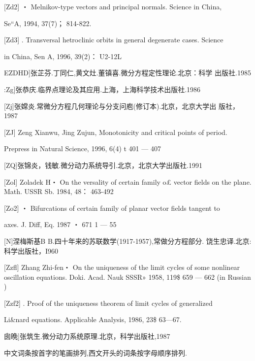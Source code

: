 \documentclass{article}
\begin{document}
{[}Zd2{]} ・ Melnikov-type vectors and principal normals. Science in
China,

Se``A, 1994, 37(7)； 814-822.

{[}Zd3{]} . Transversal hetroclinic orbits in general degenerate cases.
Science

in China, Sen A, 1996, 39(2)： U2-12L

EZDHD{]}张芷芬.丁同仁,黄文灶.董镇喜.微分方程定性理论.北京：科学
出版社.1985

:Zg{]}张恭庆.临界点理论及其应用.上海，上海科学技术出版社.1986

{[}Zj{]}张嫦炎.常微分方程几何理论与分支问庖(修订本).北京，北京大学出
版社，1987

{[}ZJ{]} Zeng Xianwu, Jing Zujun, Monotonicity and critical points of
period.

Prepress in Natural Science, 1996, 6(4) t 401 --- 407

{[}ZQ{]}张锦炎，钱敏.微分动力系统导引.北京，北京大学出版社.1991

{[}Zol{]} Zoladek H・ On the versality of certain family o£ vector
fields on the plane. Math. USSR Sb. 1984, 48： 463-492

{[}Zo2{]} ・ Bifurcations of certain family of planar vector fields
tangent to

axes. J. Diff, Eq. 1987 ・ 671 1 --- 55

{[}N{]}涅梅斯基B B.四十年来的苏联数学(1917-1957),常做分方程部分.
饶生忠译.北京:科学出版社，I960

{[}Zzfl{]} Zhang Zhi-fen・ On the uniqueness of the limit cycles of some
nonlinear oscillation equations. Doki. Acad. Nauk SSSR» 1958, 119\$ 659
--- 662 (in Russian )

{[}Zzf2{]} . Proof of the uniqueness theorem of limit cycles of
generalized

Li\&nard equations. Applicable Analysis, 1986, 23\$ 63---67.

囱晩{]}张筑生.微分动力系统原理.北京，科学出版社,1987

中文词条按首字的笔画排列,西文开头的词条按字母顺序排列.
\end{document}
